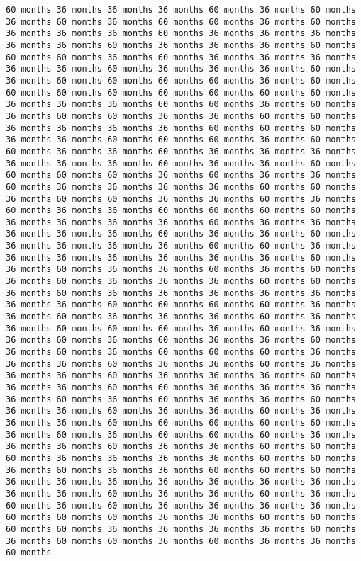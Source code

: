 \documentclass[11pt]{article}
\begin{document}
\begin{Verbatim}[commandchars=\\\{\}, frame=single, framerule=2mm, rulecolor=\color{outerrorbackground}]
60 months 36 months 36 months 36 months 60 months 36 months 60 months 36 months 60 months 36 months 60 months 60 months 36 months 60 months 36 months 36 months 36 months 60 months 36 months 36 months 36 months 36 months 36 months 60 months 36 months 36 months 36 months 60 months 60 months 60 months 36 months 60 months 36 months 36 months 36 months 36 months 36 months 60 months 36 months 36 months 36 months 60 months 36 months 60 months 60 months 60 months 60 months 36 months 60 months 60 months 60 months 60 months 60 months 60 months 60 months 60 months 36 months 36 months 36 months 60 months 60 months 36 months 60 months 36 months 60 months 60 months 36 months 36 months 60 months 60 months 36 months 36 months 36 months 36 months 60 months 60 months 60 months 36 months 36 months 60 months 60 months 60 months 36 months 60 months 60 months 36 months 36 months 60 months 36 months 36 months 36 months 36 months 36 months 36 months 60 months 36 months 36 months 60 months 60 months 60 months 60 months 36 months 60 months 36 months 36 months 60 months 36 months 36 months 36 months 36 months 60 months 60 months 36 months 60 months 60 months 36 months 36 months 60 months 36 months 60 months 36 months 36 months 60 months 60 months 60 months 60 months 36 months 36 months 36 months 36 months 60 months 36 months 36 months 36 months 36 months 36 months 60 months 36 months 36 months 60 months 36 months 36 months 36 months 36 months 60 months 60 months 36 months 36 months 36 months 36 months 36 months 36 months 36 months 60 months 36 months 60 months 36 months 36 months 60 months 36 months 60 months 36 months 60 months 36 months 36 months 36 months 60 months 60 months 36 months 60 months 36 months 36 months 36 months 36 months 36 months 36 months 36 months 60 months 60 months 60 months 60 months 36 months 36 months 60 months 36 months 36 months 36 months 60 months 36 months 36 months 60 months 60 months 60 months 36 months 60 months 36 months 36 months 60 months 36 months 60 months 36 months 36 months 60 months 36 months 60 months 36 months 60 months 60 months 60 months 36 months 36 months 36 months 60 months 36 months 36 months 60 months 36 months 36 months 36 months 60 months 36 months 36 months 36 months 60 months 36 months 36 months 60 months 60 months 36 months 36 months 36 months 36 months 60 months 36 months 60 months 36 months 36 months 60 months 36 months 36 months 60 months 36 months 36 months 60 months 36 months 36 months 36 months 60 months 60 months 60 months 60 months 60 months 36 months 60 months 36 months 60 months 60 months 60 months 36 months 36 months 36 months 60 months 36 months 36 months 60 months 60 months 60 months 36 months 36 months 36 months 36 months 60 months 60 months 36 months 60 months 36 months 36 months 60 months 60 months 60 months 36 months 36 months 36 months 36 months 36 months 36 months 36 months 36 months 36 months 60 months 36 months 36 months 60 months 36 months 60 months 36 months 60 months 36 months 36 months 36 months 36 months 60 months 60 months 60 months 36 months 36 months 60 months 60 months 60 months 60 months 36 months 36 months 36 months 36 months 60 months 36 months 60 months 60 months 36 months 60 months 36 months 36 months 60 months 
\end{Verbatim}
\end{document}
